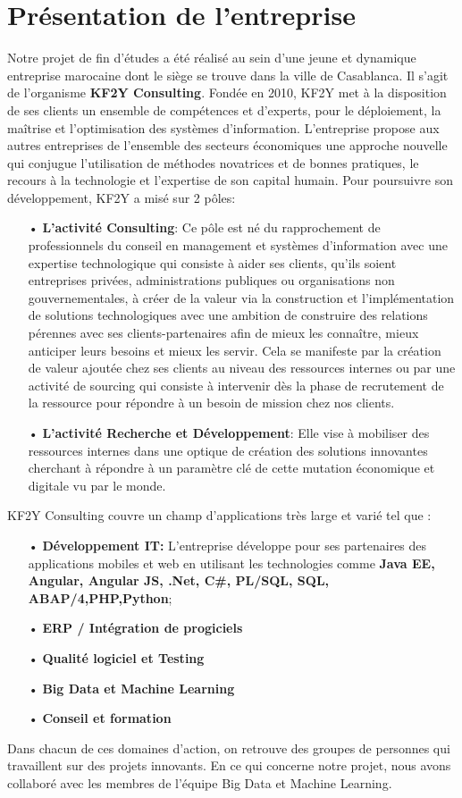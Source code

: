 \section{Présentation de l'entreprise}

Notre projet de fin d’études a été réalisé au sein d’une jeune et dynamique entreprise marocaine dont le siège se trouve dans la ville de Casablanca. Il s’agit de l’organisme \textbf{KF2Y Consulting}. Fondée en 2010, KF2Y met à la disposition de ses clients un ensemble de compétences et d’experts, pour le déploiement, la maîtrise et l’optimisation des systèmes d’information. L’entreprise propose aux autres entreprises de l'ensemble des secteurs économiques une approche nouvelle qui conjugue l'utilisation de méthodes novatrices et de bonnes pratiques, le recours à la technologie et l'expertise de son capital humain. Pour poursuivre son développement, KF2Y a misé sur 2 pôles:
    \begin{itemize}
        \item[•] \textbf{L’activité Consulting}: 
        Ce pôle est né du rapprochement de professionnels du conseil en management et systèmes d’information avec une expertise technologique qui consiste à aider ses clients, qu’ils soient entreprises privées, administrations publiques ou organisations non gouvernementales, à créer de la valeur via la construction et l’implémentation de solutions technologiques avec une ambition de construire des relations pérennes avec ses  clients-partenaires afin de mieux les connaître, mieux anticiper leurs besoins et mieux les servir. Cela se manifeste par la création de valeur ajoutée chez ses clients au niveau des ressources internes ou par une activité de sourcing qui consiste à intervenir dès la phase de recrutement de la ressource pour répondre à un besoin de mission chez nos clients.
        \item[•] \textbf{L’activité Recherche et Développement}: Elle vise à mobiliser des ressources internes dans une optique de création des solutions innovantes cherchant à répondre à un paramètre clé de cette mutation économique et digitale vu par le monde.
    \end{itemize}
 KF2Y Consulting couvre un champ d’applications très large et varié tel que :
    \begin{enumerate}
        \item[•] \textbf{Développement IT:} L'entreprise développe pour ses partenaires des applications mobiles et web en utilisant les technologies comme \textbf{Java EE, Angular, Angular JS, .Net, C\#, PL/SQL, SQL, ABAP/4,PHP,Python};
        \item[•] \textbf{ERP / Intégration de progiciels}
        \item[•] \textbf{Qualité logiciel et Testing}
        \item[•] \textbf{Big Data et Machine Learning}
        \item[•]  \textbf{Conseil et formation}
    \end{enumerate}
Dans chacun de ces domaines d'action, on retrouve des groupes de personnes qui travaillent sur des projets innovants. En ce qui concerne notre projet, nous avons collaboré avec les membres de l'équipe Big Data et Machine Learning.


